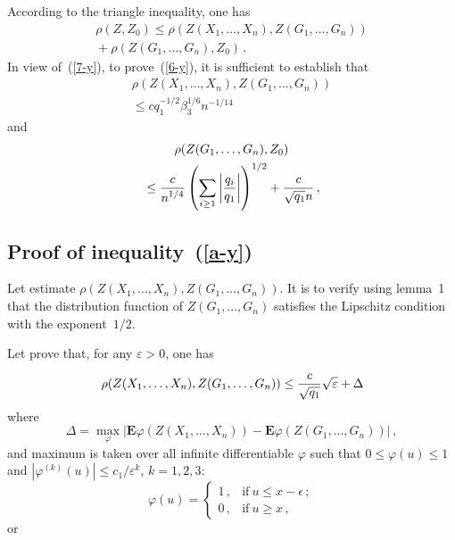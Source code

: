 \begin{multicols}{2}
     According to the triangle inequality, one has
     \begin{multline}
     \label{7-y}
    \rho (Z,Z_0)\leq \rho(Z(X_1,\ldots,X_n),Z(G_1,\ldots,G_n))\\
    {}+\rho(Z(G_1,\ldots,G_n),Z_0)\,.
     \end{multline}
     In view of~(\ref{7-y}), to prove~(\ref{6-y}),  it is sufficient to establish that
     \begin{multline}
   \rho(Z(X_1,\ldots,X_n),Z(G_1,\ldots,G_n))\\
   {}\leq cq_1^{-1/2}\beta_3^{1/6}n^{-1/14}
        \label{a-y}
     \end{multline}
     and
    \begin{multline}
   \rho(Z(G_1,\ldots,G_n),Z_0)\\
   {}\leq \displaystyle\frac{\displaystyle c\mathstrut}{\displaystyle n^{1/4}\mathstrut}
    \left(\sum\limits_{i\geq 1}\left\vert\displaystyle\frac{\displaystyle q_i\mathstrut}{\displaystyle q_1\mathstrut}\right\vert\right)^{1/2}
+
    \displaystyle\frac{\displaystyle c\mathstrut}{\displaystyle \sqrt{q_1}n\mathstrut}\,,
        \label{b}
     \end{multline}

     \subsection{Proof of inequality~(\ref{a-y})}

\noindent
Let estimate $\rho(Z(X_1,\ldots,X_n),Z(G_1,\ldots,G_n))$.
    It is to verify using lemma~1 that the distribution function of
    $Z(G_1,\ldots,G_n)$ satisfies the Lipschitz condition with the exponent~$1/2$.

    Let prove that, for any $\varepsilon  >0$, one has
         \begin{equation}
         \label{c4}
\rho(Z(X_1,\ldots,X_n),Z(G_1,\ldots,G_n))\leq \displaystyle\frac{\displaystyle c\mathstrut}{\displaystyle \sqrt{q_1}\mathstrut}\sqrt{\varepsilon}+\Delta\!
    \end{equation}
where
    $$
    \Delta=\max\limits_\varphi |\mathbf{E}\varphi(Z(X_1,\ldots,X_n))-
    \mathbf{E}\varphi(Z(G_1,\ldots,G_n))|\,,  
    $$
    and maximum is taken over all infinite differentiable $\varphi$ such
    that $0 \leq\varphi(u) \leq1$ and
      $|\varphi^{(k)}(u)| \leq
    c_1/\varepsilon^{k}$, $k =1,2,3$:
    \begin{equation}
    \label{c2}
\varphi(u)=
    \begin{cases}
    1\,, &\mbox{if}\  u\leq x-\epsilon\,; \\[6pt]
    0\,, &\mbox{if}\ u\geq x\,,
    \end{cases}
\end{equation}
    or
    

\end{multicols}
